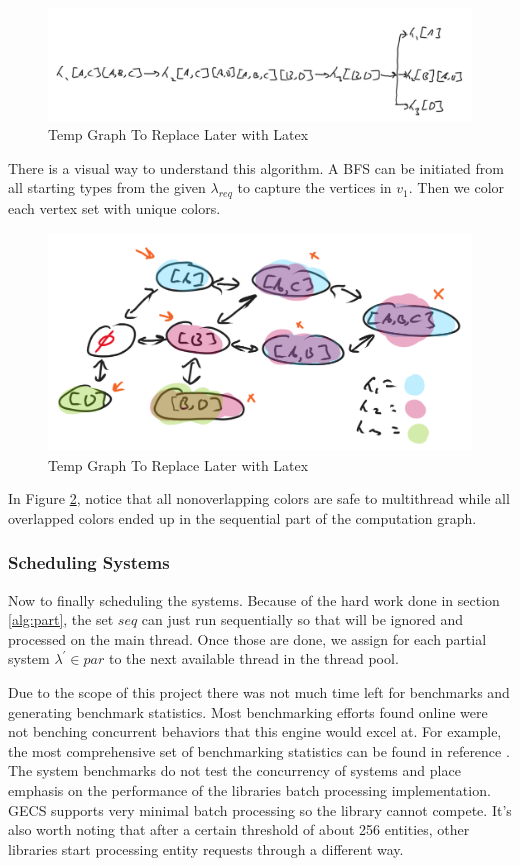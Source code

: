 \begin{figure}[H]
    \centering
    \includegraphics[width=0.5\linewidth]{resources/computation_graph.png}
    \caption{Temp Graph To Replace Later with Latex}
    \label{fig:temp1}
\end{figure}

There is a visual way to understand this algorithm. A BFS can be initiated from all starting types from the given $\lambda_{req}$ to capture the vertices in $v_1$. Then we color each vertex set with unique colors. 

\begin{figure}[H]
    \centering
    \includegraphics[width=0.5\linewidth]{resources/color_graph.png}
    \caption{Temp Graph To Replace Later with Latex}
    \label{fig:graph2}
\end{figure}

In Figure \ref{fig:graph2}, notice that all nonoverlapping colors are safe to multithread while all overlapped colors ended up in the sequential part of the computation graph.

\subsubsection{Scheduling Systems}
Now to finally scheduling the systems. Because of the hard work done in section \ref{alg:part}, the set $seq$ can just run sequentially so that will be ignored and processed on the main thread. Once those are done, we assign for each partial system $\lambda^\prime \in par$ to the next available thread in the thread pool. 



Due to the scope of this project there was not much time left for benchmarks and generating benchmark statistics. Most benchmarking efforts found online were not benching concurrent behaviors that this engine would excel at. For example, the most comprehensive set of benchmarking statistics can be found in reference \cite{ECS_benchmark}. The system benchmarks do not test the concurrency of systems and place emphasis on the performance of the libraries batch processing implementation. GECS supports very minimal batch processing so the library cannot compete. It's also worth noting that after a certain threshold of about 256 entities, other libraries start processing entity requests through a different way.

